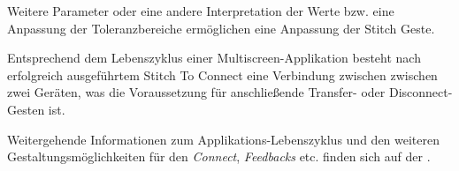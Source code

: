 {Weitere Parameter oder eine andere Interpretation der Werte bzw. eine Anpassung der Toleranzbereiche ermöglichen eine Anpassung der Stitch Geste.

Entsprechend dem Lebenszyklus einer Multiscreen-Applikation besteht nach erfolgreich
ausgeführtem Stitch To Connect eine Verbindung zwischen zwischen zwei Geräten, was die Voraussetzung für anschließende Transfer- oder Disconnect-Gesten ist.

Weitergehende Informationen zum Applikations-Lebenszyklus und den weiteren
Gestaltungsmöglichkeiten für den \textit{Connect}, \textit{Feedbacks} etc. finden sich auf der \developerpage.
}


\newcommand{\authors}{Horst Schneider, Hochschule Mannheim\\
Dominick Madden, Hochschule Mannheim}
\newcommand{\versionhistory}{16.09.2016}
\newcommand{\dateofcreation}{17.09.2015}
\newcommand{\comments}{...}
\newcommand{\questions}{...}



